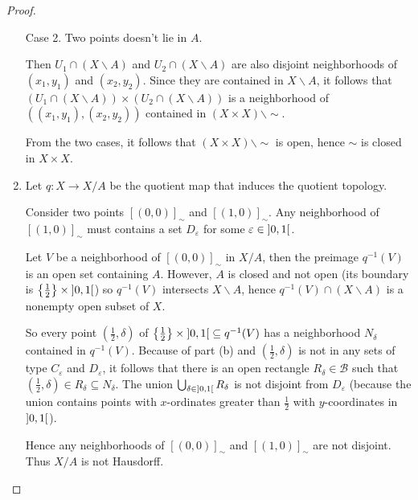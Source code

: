\begin{proof}
\begin{enumerate}[label={(\alph*)}]
		      Case 2. Two points doesn't lie in $A$.

		      Then $U_{1}\cap (X\smallsetminus A)$ and $U_{2} \cap (X\smallsetminus A)$ are also disjoint neighborhoods of $(x_{1}, y_{1})$ and $(x_{2}, y_{2})$. Since they are contained in $X\smallsetminus A$, it follows that $(U_{1}\cap (X\smallsetminus A)) \times (U_{2}\cap (X\smallsetminus A))$ is a neighborhood of $\left((x_{1}, y_{1}), (x_{2}, y_{2})\right)$ contained in $(X\times X)\smallsetminus\sim$.

		      From the two cases, it follows that $(X\times X)\smallsetminus\sim$ is open, hence $\sim$ is closed in $X\times X$.
		\item Let $q: X\to X/A$ be the quotient map that induces the quotient topology.

		      Consider two points ${[(0, 0)]}_{\sim}$ and ${[(1,0)]}_{\sim}$. Any neighborhood of ${[(1,0)]}_{\sim}$ must contains a set $D_{\varepsilon}$ for some $\varepsilon \in \left]{0, 1}\right[$.

		      Let $V$ be a neighborhood of ${[(0, 0)]}_{\sim}$ in $X/A$, then the preimage $q^{-1}(V)$ is an open set containing $A$. However, $A$ is closed and not open (its boundary is $\left\{{\frac{1}{2}}\right\}\times\left]{0,1}\right[$) so $q^{-1}(V)$ intersects $X\smallsetminus A$, hence $q^{-1}(V) \cap (X\smallsetminus A)$ is a nonempty open subset of $X$.

		      So every point $(\frac{1}{2}, \delta)$ of $\left\{{\frac{1}{2}}\right\} \times \left]{0, 1}\right[ \subseteq q^{-1}(V)$ has a neighborhood $N_{\delta}$ contained in $q^{-1}(V)$. Because of part (b) and $(\frac{1}{2}, \delta)$ is not in any sets of type $C_{\varepsilon}$ and $D_{\varepsilon}$, it follows that there is an open rectangle $R_{\delta}\in \mathscr{B}$ such that $(\frac{1}{2}, \delta) \in R_{\delta} \subseteq N_{\delta}$. The union $\bigcup_{\delta\in \left]{0,1}\right[} R_{\delta}$ is not disjoint from $D_{\varepsilon}$ (because the union contains points with $x$-ordinates greater than $\frac{1}{2}$ with $y$-coordinates in $\left]{0,1}\right[$).

		      Hence any neighborhoods of ${[(0, 0)]}_{\sim}$ and ${[(1,0)]}_{\sim}$ are not disjoint. Thus $X/A$ is not Hausdorff.
	\end{enumerate}
\end{proof}

